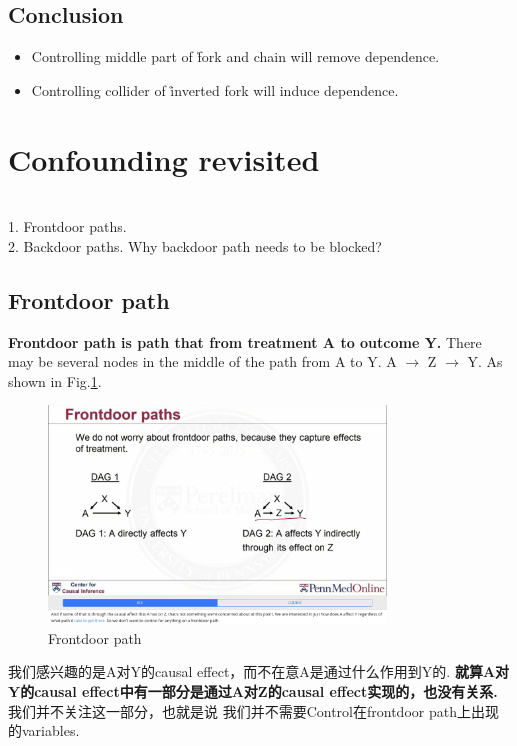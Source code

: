 \subsection{Conclusion}
\begin{itemize}
	\item Controlling middle part of {\r {fork and chain}} will remove dependence. 
	\item Controlling collider of {\r {inverted fork}} will induce dependence. 
\end{itemize}



\section{Confounding revisited}
 \\
1. Frontdoor paths. \\
2. Backdoor paths. Why backdoor path needs to be blocked?

\subsection{Frontdoor path}
{\bfseries Frontdoor path is path that from treatment A to outcome Y. }There may be several nodes in the middle of the path from A to Y. A $\longrightarrow$ Z $\longrightarrow$ Y. As shown in Fig.\ref{frontdoor}.
	\begin{figure}[htbp]
	\setlength{\abovecaptionskip}{0pt}     %
	\setlength{\belowcaptionskip}{10pt}
	\vspace{-0cm}  %
	\setlength{\abovecaptionskip}{-0cm}   %
	\setlength{\belowcaptionskip}{-0cm}   %
	\centering
	\includegraphics[width=0.8\textwidth]{figure/frontdoor.jpg}
	\caption{Frontdoor path}
	\label{frontdoor}
    \end{figure}
我们感兴趣的是A对Y的causal effect，而不在意A是通过什么作用到Y的. {\bfseries 就算A对Y的causal effect中有一部分是通过A对Z的causal effect实现的，也没有关系. } 我们并不关注这一部分，也就是说 {\color{red} 我们并不需要Control在frontdoor path上出现的variables.}

